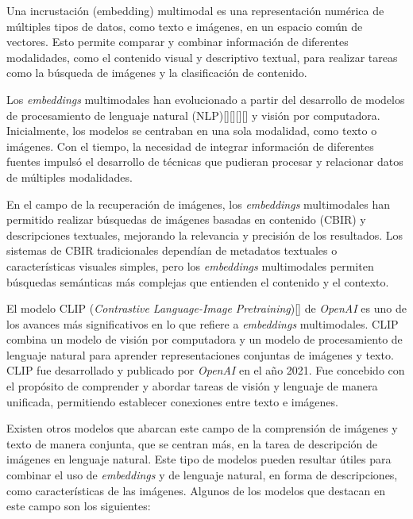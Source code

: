 Una incrustaci\'on (embedding) multimodal es una representación numérica de múltiples tipos de datos, como texto e imágenes, en un espacio común de vectores. Esto permite comparar y combinar información de diferentes modalidades, como el contenido visual y descriptivo textual, para realizar tareas como la búsqueda de imágenes y la clasificación de contenido.

Los \textit{embeddings} multimodales han evolucionado a partir del desarrollo de modelos de procesamiento de lenguaje natural (NLP)[\cite{LLaMA2023}][\cite{gpt3}][\cite{bert}][\cite{gpt4}] y visión por computadora. Inicialmente, los modelos se centraban en una sola modalidad, como texto o imágenes. Con el tiempo, la necesidad de integrar información de diferentes fuentes impulsó el desarrollo de técnicas que pudieran procesar y relacionar datos de múltiples modalidades.


En el campo de la recuperación de imágenes, los \textit{embeddings} multimodales han permitido realizar búsquedas de imágenes basadas en contenido (CBIR) y descripciones textuales, mejorando la relevancia y precisión de los resultados. Los sistemas de CBIR tradicionales dependían de metadatos textuales o características visuales simples, pero los \textit{embeddings} multimodales permiten búsquedas semánticas más complejas que entienden el contenido y el contexto.

El modelo CLIP (\textit{Contrastive Language-Image Pretraining})[\cite{clip-paper}] de \textit{OpenAI} es uno de los avances más significativos en lo que refiere a  \textit{embeddings} multimodales. CLIP combina un modelo de visión por computadora y un modelo de procesamiento de lenguaje natural para aprender representaciones conjuntas de imágenes y texto. CLIP fue desarrollado y publicado por \textit{OpenAI} en el a\~no 2021. Fue concebido con el prop\'osito de comprender y abordar tareas de visi\'on y lenguaje de manera unificada, permitiendo establecer conexiones entre texto e im\'agenes.

Existen otros modelos que abarcan este campo de la comprensión de imágenes y texto de manera conjunta, que se centran más, en la tarea de descripción de imágenes en lenguaje natural. Este tipo de modelos pueden resultar útiles para combinar el uso de \textit{embeddings} y de lenguaje natural, en forma de descripciones, como características de las imágenes. Algunos de los modelos que destacan en este campo son los siguientes:

